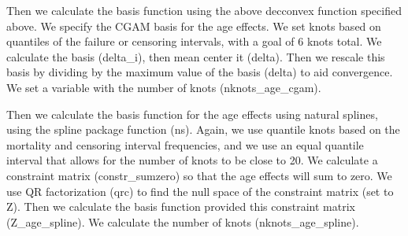 \documentclass[11pt,]{article}
\newenvironment{Shaded}{\begin{snugshade}}{\end{snugshade}}
\newcommand{\KeywordTok}[1]{\textcolor[rgb]{0.13,0.29,0.53}{\textbf{#1}}}
\newcommand{\DataTypeTok}[1]{\textcolor[rgb]{0.13,0.29,0.53}{#1}}
\newcommand{\DecValTok}[1]{\textcolor[rgb]{0.00,0.00,0.81}{#1}}
\newcommand{\StringTok}[1]{\textcolor[rgb]{0.31,0.60,0.02}{#1}}
\newcommand{\OperatorTok}[1]{\textcolor[rgb]{0.81,0.36,0.00}{\textbf{#1}}}
\newcommand{\NormalTok}[1]{#1}
\begin{document}
Then we calculate the basis function using the above decconvex function
specified above. We specify the CGAM basis for the age effects. We set
knots based on quantiles of the failure or censoring intervals, with a
goal of 6 knots total. We calculate the basis (delta\_i), then mean
center it (delta). Then we rescale this basis by dividing by the maximum
value of the basis (delta) to aid convergence. We set a variable with
the number of knots (nknots\_age\_cgam).

\begin{Shaded}
\end{Shaded}

Then we calculate the basis function for the age effects using natural
splines, using the spline package function (ns). Again, we use quantile
knots based on the mortality and censoring interval frequencies, and we
use an equal quantile interval that allows for the number of knots to be
close to 20. We calculate a constraint matrix (constr\_sumzero) so that
the age effects will sum to zero. We use QR factorization (qrc) to find
the null space of the constraint matrix (set to Z). Then we calculate
the basis function provided this constraint matrix (Z\_age\_spline). We
calculate the number of knots (nknots\_age\_spline).
\end{document}
